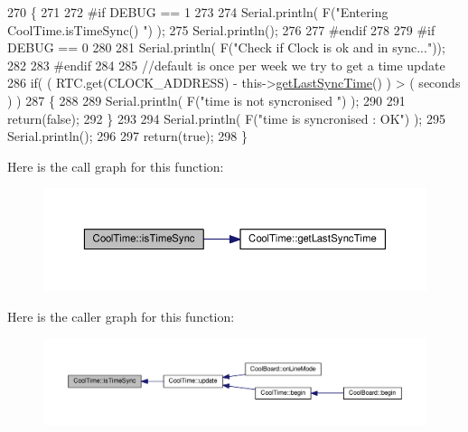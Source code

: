 \begin{DoxyCode}
270 \{
271 
272 \textcolor{preprocessor}{#if DEBUG == 1}
273 
274     Serial.println( F(\textcolor{stringliteral}{"Entering CoolTime.isTimeSync() "}) );
275     Serial.println();
276 
277 \textcolor{preprocessor}{#endif }
278 
279 \textcolor{preprocessor}{#if DEBUG == 0}
280 
281     Serial.println( F(\textcolor{stringliteral}{"Check if Clock is ok and in sync..."}));
282 
283 \textcolor{preprocessor}{#endif}
284 
285     \textcolor{comment}{//default is once per week we try to get a time update}
286     \textcolor{keywordflow}{if}( ( RTC.get(CLOCK\_ADDRESS) - this->\hyperlink{class_cool_time_a5d17f707a9d337720493b2bce9d41c21}{getLastSyncTime}() ) > ( seconds ) ) 
287     \{
288 
289         Serial.println( F(\textcolor{stringliteral}{"time is not syncronised "}) );
290     
291         \textcolor{keywordflow}{return}(\textcolor{keyword}{false});  
292     \}
293     
294     Serial.println( F(\textcolor{stringliteral}{"time is syncronised : OK"}) );
295     Serial.println();
296 
297     \textcolor{keywordflow}{return}(\textcolor{keyword}{true});
298 \}
\end{DoxyCode}
Here is the call graph for this function\+:\nopagebreak
\begin{figure}[H]
\begin{center}
\leavevmode
\includegraphics[width=350pt]{d6/d49/class_cool_time_a5ae038a4498602b189f76a10bf02adf8_cgraph}
\end{center}
\end{figure}
Here is the caller graph for this function\+:\nopagebreak
\begin{figure}[H]
\begin{center}
\leavevmode
\includegraphics[width=350pt]{d6/d49/class_cool_time_a5ae038a4498602b189f76a10bf02adf8_icgraph}
\end{center}
\end{figure}
\mbox{\label{class_cool_time_af355e7f9b3898211cd2ff25eab5933b1}} 
